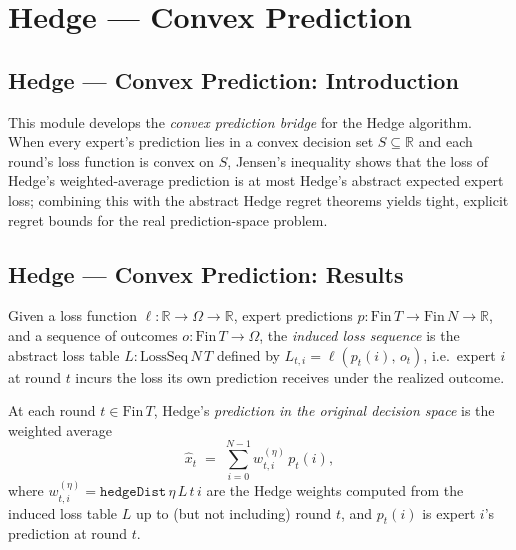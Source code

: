 \section{Hedge --- Convex Prediction}
\subsection*{Hedge --- Convex Prediction: Introduction}

This module develops the \emph{convex prediction bridge} for the Hedge algorithm.
When every expert's prediction lies in a convex decision set $S \subseteq \mathbb{R}$
and each round's loss function is convex on $S$, Jensen's inequality shows that the
loss of Hedge's weighted-average prediction is at most Hedge's abstract expected expert
loss; combining this with the abstract Hedge regret theorems yields tight, explicit
regret bounds for the real prediction-space problem.

\subsection*{Hedge --- Convex Prediction: Results}

\begin{definition}
\label{inducedLoss}
\leanok
{}
Given a loss function $\ell : \mathbb{R} \to \Omega \to \mathbb{R}$, expert predictions
$p : \mathrm{Fin}\,T \to \mathrm{Fin}\,N \to \mathbb{R}$, and a sequence of outcomes
$o : \mathrm{Fin}\,T \to \Omega$, the \emph{induced loss sequence} is the abstract
loss table $L : \mathrm{LossSeq}\,N\,T$ defined by $L_{t,i} = \ell(p_t(i),\, o_t)$,
i.e.\ expert $i$ at round $t$ incurs the loss its own prediction receives under the
realized outcome.
\end{definition}

\begin{definition}
\label{hedgePrediction}
\leanok
{}
At each round $t \in \mathrm{Fin}\,T$, Hedge's \emph{prediction in the original
decision space} is the weighted average
\[
  \widehat{x}_t \;=\; \sum_{i=0}^{N-1} w^{(\eta)}_{t,i}\, p_t(i),
\]
where $w^{(\eta)}_{t,i} = \texttt{hedgeDist}\,\eta\,L\,t\,i$ are the Hedge
weights computed from the induced loss table $L$ up to (but not including) round $t$,
and $p_t(i)$ is expert $i$'s prediction at round $t$.
\end{definition}

